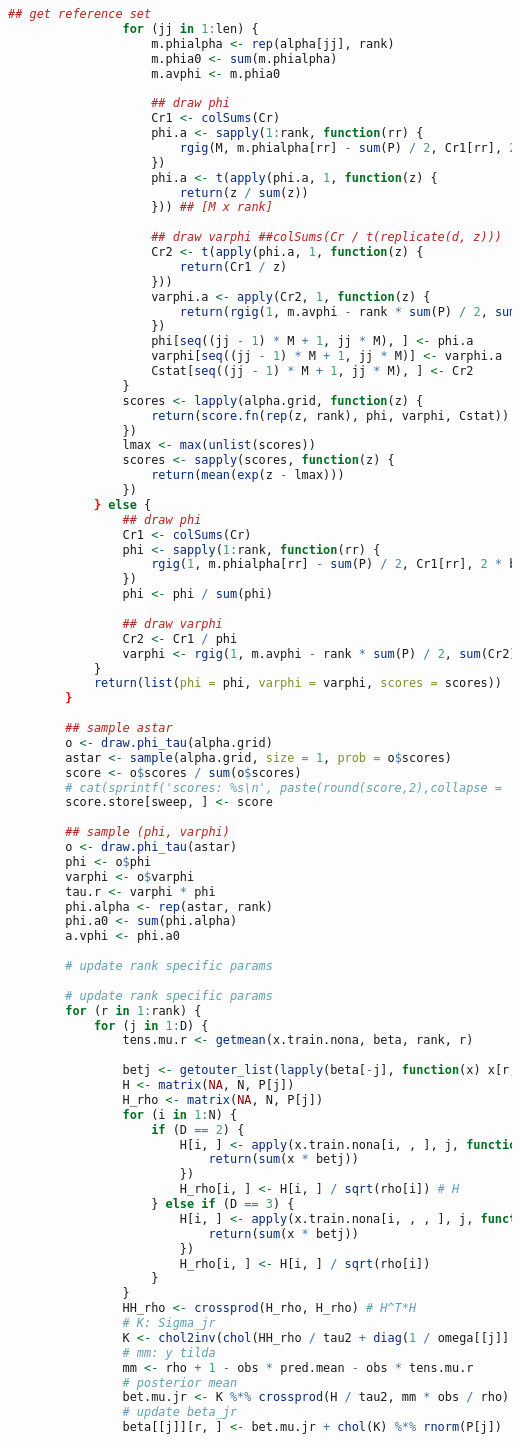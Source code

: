\documentclass[AutoFakeBold]{LZUThesis}
\begin{document}
\begin{lstlisting}[language=R, caption = {BT-SVM}算法]
				## get reference set
				for (jj in 1:len) {
					m.phialpha <- rep(alpha[jj], rank)
					m.phia0 <- sum(m.phialpha)
					m.avphi <- m.phia0
					
					## draw phi
					Cr1 <- colSums(Cr)
					phi.a <- sapply(1:rank, function(rr) {
						rgig(M, m.phialpha[rr] - sum(P) / 2, Cr1[rr], 2 * b.vphi)
					})
					phi.a <- t(apply(phi.a, 1, function(z) {
						return(z / sum(z))
					})) ## [M x rank]
					
					## draw varphi ##colSums(Cr / t(replicate(d, z)))
					Cr2 <- t(apply(phi.a, 1, function(z) {
						return(Cr1 / z)
					}))
					varphi.a <- apply(Cr2, 1, function(z) {
						return(rgig(1, m.avphi - rank * sum(P) / 2, sum(z), 2 * b.vphi))
					})
					phi[seq((jj - 1) * M + 1, jj * M), ] <- phi.a
					varphi[seq((jj - 1) * M + 1, jj * M)] <- varphi.a
					Cstat[seq((jj - 1) * M + 1, jj * M), ] <- Cr2
				}
				scores <- lapply(alpha.grid, function(z) {
					return(score.fn(rep(z, rank), phi, varphi, Cstat))
				})
				lmax <- max(unlist(scores))
				scores <- sapply(scores, function(z) {
					return(mean(exp(z - lmax)))
				})
			} else {
				## draw phi
				Cr1 <- colSums(Cr)
				phi <- sapply(1:rank, function(rr) {
					rgig(1, m.phialpha[rr] - sum(P) / 2, Cr1[rr], 2 * b.vphi)
				})
				phi <- phi / sum(phi)
				
				## draw varphi
				Cr2 <- Cr1 / phi
				varphi <- rgig(1, m.avphi - rank * sum(P) / 2, sum(Cr2), 2 * b.vphi)
			}
			return(list(phi = phi, varphi = varphi, scores = scores))
		}
		
		## sample astar
		o <- draw.phi_tau(alpha.grid)
		astar <- sample(alpha.grid, size = 1, prob = o$scores)
		score <- o$scores / sum(o$scores)
		# cat(sprintf('scores: %s\n', paste(round(score,2),collapse = ', ')))
		score.store[sweep, ] <- score
		
		## sample (phi, varphi)
		o <- draw.phi_tau(astar)
		phi <- o$phi
		varphi <- o$varphi
		tau.r <- varphi * phi
		phi.alpha <- rep(astar, rank)
		phi.a0 <- sum(phi.alpha)
		a.vphi <- phi.a0
		
		# update rank specific params 
		
		# update rank specific params
		for (r in 1:rank) {
			for (j in 1:D) {
				tens.mu.r <- getmean(x.train.nona, beta, rank, r)
				
				betj <- getouter_list(lapply(beta[-j], function(x) x[r, ]))
				H <- matrix(NA, N, P[j])
				H_rho <- matrix(NA, N, P[j])
				for (i in 1:N) {
					if (D == 2) {
						H[i, ] <- apply(x.train.nona[i, , ], j, function(x) {
							return(sum(x * betj))
						})
						H_rho[i, ] <- H[i, ] / sqrt(rho[i]) # H
					} else if (D == 3) {
						H[i, ] <- apply(x.train.nona[i, , , ], j, function(x) {
							return(sum(x * betj))
						})
						H_rho[i, ] <- H[i, ] / sqrt(rho[i])
					}
				}
				HH_rho <- crossprod(H_rho, H_rho) # H^T*H
				# K: Sigma_jr
				K <- chol2inv(chol(HH_rho / tau2 + diag(1 / omega[[j]][r, ]) / tau.r[r]))
				# mm: y tilda
				mm <- rho + 1 - obs * pred.mean - obs * tens.mu.r
				# posterior mean
				bet.mu.jr <- K %*% crossprod(H / tau2, mm * obs / rho)
				# update beta_jr
				beta[[j]][r, ] <- bet.mu.jr + chol(K) %*% rnorm(P[j])
				

\end{lstlisting}
\end{document}
